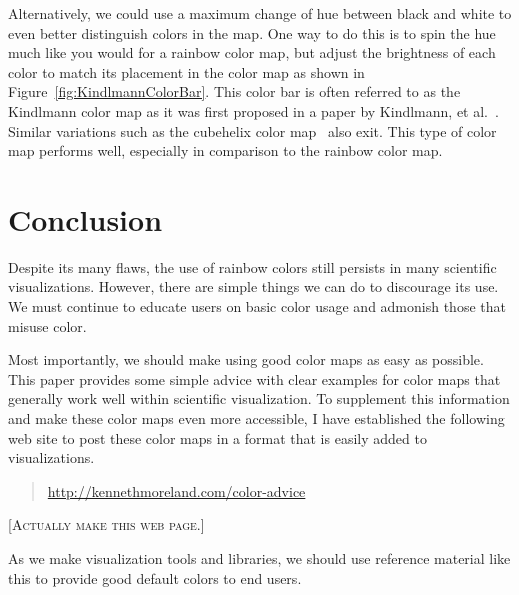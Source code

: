 \documentclass[letterpaper,twocolumn,fleqn]{article}
\newcommand*{\lcite}[1]{~\cite{#1}}
\newcommand*{\scite}[1]{~\cite{#1}}
\newcommand{\etal}{et al.\xspace}
\newcommand{\fix}[1]{{\color{red}\textsc{[#1]}}}
\begin{document}
Alternatively, we could use a maximum change of hue between black and white
to even better distinguish colors in the map. One way to do this is to spin
the hue much like you would for a rainbow color map, but adjust the
brightness of each color to match its placement in the color map as shown
in Figure~\ref{fig:KindlmannColorBar}. This color bar is often referred to
as the Kindlmann color map as it was first proposed in a paper by
Kindlmann, \etal\scite{Kindlmann2002}. Similar variations such as the
cubehelix color map\lcite{Green2011} also exit. This type of color map
performs well, especially in comparison to the rainbow color map.




\section{Conclusion}

\noindent
Despite its many flaws, the use of rainbow colors still persists in many
scientific visualizations. However, there are simple things we can do to
discourage its use. We must continue to educate users on basic color usage
and admonish those that misuse color.

Most importantly, we should make using good color maps as easy as possible.
This paper provides some simple advice with clear examples for color maps
that generally work well within scientific visualization. To supplement
this information and make these color maps even more accessible, I have
established the following web site to post these color maps in a format
that is easily added to visualizations.

\begin{quote}
  \url{http://kennethmoreland.com/color-advice}
\end{quote}

\fix{Actually make this web page.}

As we make visualization tools and libraries, we should use reference
material like this to provide good default colors to end users.
\end{document}
